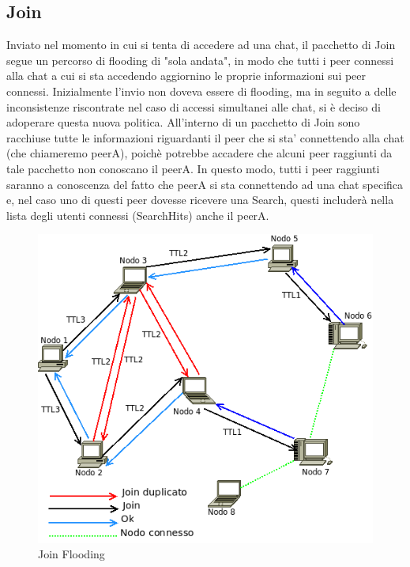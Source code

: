 \subsection{Join}
Inviato nel momento in cui si tenta di accedere ad una chat, il pacchetto di Join segue un percorso di flooding di "sola andata", in modo che tutti i peer connessi alla chat a cui si sta accedendo aggiornino le proprie informazioni sui peer connessi. Inizialmente l'invio non doveva essere di flooding, ma in seguito a delle inconsistenze riscontrate nel caso di accessi simultanei alle chat, si è deciso di adoperare questa nuova politica. All'interno di un pacchetto di Join sono racchiuse tutte le informazioni riguardanti il peer che si sta' connettendo alla chat (che chiameremo peerA), poichè potrebbe accadere che alcuni peer raggiunti da tale pacchetto non conoscano il peerA. In questo modo, tutti i peer raggiunti saranno a conoscenza del fatto che peerA si sta connettendo ad una chat specifica e, nel caso uno di questi peer dovesse ricevere una Search, questi includerà nella lista degli utenti connessi (SearchHits) anche il peerA.
\begin{figure}[H]
\begin{center}
\includegraphics[scale=0.5]{etc/Join.png}
\caption{Join Flooding}
\label{joinflooding}
\end{center}
\end{figure}
